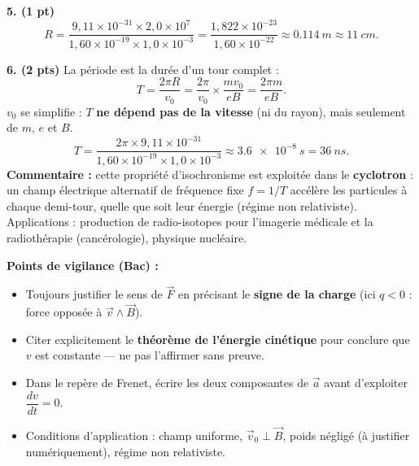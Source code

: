 \documentclass[11pt]{article}
\newcommand{\cle}[1]{{\popxbold\color{popdark}#1}}
\begin{document}
\begin{corrige}
\textbf{5. (1 pt)}
\[ R = \frac{9{,}11\times 10^{-31}\times 2{,}0\times 10^{7}}{1{,}60\times 10^{-19}\times 1{,}0\times 10^{-3}} = \frac{1{,}822\times 10^{-23}}{1{,}60\times 10^{-22}} \approx \SI{0,114}{m} \approx \SI{11}{cm}. \]

\textbf{6. (2 pts)} La période est la durée d'un tour complet :
\[ T = \frac{2\pi R}{v_0} = \frac{2\pi}{v_0}\times\frac{mv_0}{eB} = \frac{2\pi m}{eB}. \]
$v_0$ se simplifie : $T$ \textbf{ne dépend pas de la vitesse} (ni du rayon), mais seulement de $m$, $e$ et $B$.
\[ T = \frac{2\pi\times 9{,}11\times 10^{-31}}{1{,}60\times 10^{-19}\times 1{,}0\times 10^{-3}} \approx \SI{3,6e-8}{s} = \SI{36}{ns}. \]
\textbf{Commentaire :} cette propriété d'\cle{isochronisme} est exploitée dans le \textbf{cyclotron} : un champ électrique alternatif de fréquence fixe $f = 1/T$ accélère les particules à chaque demi-tour, quelle que soit leur énergie (régime non relativiste). Applications : production de radio-isotopes pour l'imagerie médicale et la radiothérapie (cancérologie), physique nucléaire.

\textbf{Points de vigilance (Bac) :}
\begin{itemize}
\item Toujours justifier le sens de $\vec{F}$ en précisant le \textbf{signe de la charge} (ici $q<0$ : force opposée à $\vec{v}\wedge\vec{B}$).
\item Citer explicitement le \textbf{théorème de l'énergie cinétique} pour conclure que $v$ est constante — ne pas l'affirmer sans preuve.
\item Dans le repère de Frenet, écrire les deux composantes de $\vec{a}$ avant d'exploiter $\dfrac{dv}{dt}=0$.
\item Conditions d'application : champ uniforme, $\vec{v}_0 \perp \vec{B}$, poids négligé (à justifier numériquement), régime non relativiste.
\end{itemize}
\end{corrige}
\end{document}
